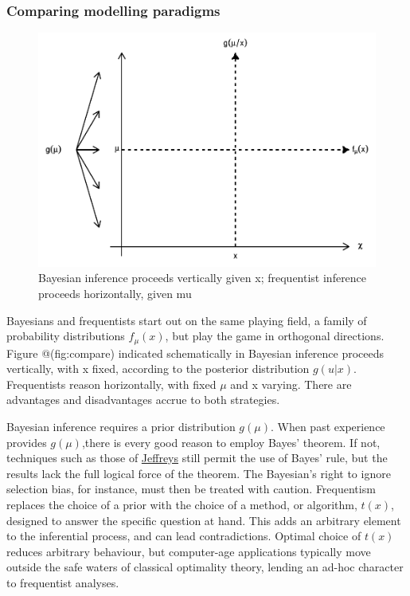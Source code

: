 \documentclass{article}
\begin{document}
\hypertarget{comparing-modelling-paradigms}{%
\subsubsection{Comparing modelling
paradigms}\label{comparing-modelling-paradigms}}

\begin{figure}

{\centering \includegraphics{qrap_paper_files/figure-latex/compare-1} 

}

\caption{Bayesian inference proceeds vertically given x; frequentist inference proceeds horizontally, given mu}\label{fig:compare}
\end{figure}

Bayesians and frequentists start out on the same playing field, a family
of probability distributions \(f_{\mu}(x)\), but play the game in
orthogonal directions. Figure @(fig:compare) indicated schematically in
Bayesian inference proceeds vertically, with x fixed, according to the
posterior distribution \(g(u|x)\). Frequentists reason horizontally,
with fixed \(\mu\) and x varying. There are advantages and disadvantages
accrue to both strategies.

Bayesian inference requires a prior distribution \(g(\mu)\). When past
experience provides \(g(\mu)\),there is every good reason to employ
Bayes' theorem. If not, techniques such as those of
\href{https://en.wikipedia.org/wiki/Jeffreys_prior}{Jeffreys} still
permit the use of Bayes' rule, but the results lack the full logical
force of the theorem. The Bayesian's right to ignore selection bias, for
instance, must then be treated with caution. Frequentism replaces the
choice of a prior with the choice of a method, or algorithm, \(t(x)\),
designed to answer the specific question at hand. This adds an arbitrary
element to the inferential process, and can lead contradictions. Optimal
choice of \(t(x)\) reduces arbitrary behaviour, but computer-age
applications typically move outside the safe waters of classical
optimality theory, lending an ad-hoc character to frequentist analyses.
\end{document}
